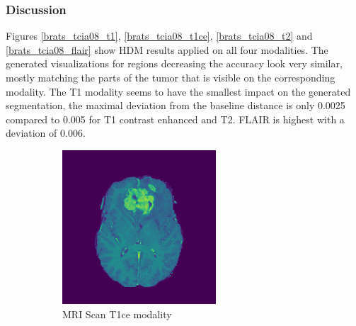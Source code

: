 \subsubsection{Discussion}
Figures \ref{brats_tcia08_t1}, \ref{brats_tcia08_t1ce}, \ref{brats_tcia08_t2} and \ref{brats_tcia08_flair} show HDM results applied on all four modalities. The generated visualizations for regions decreasing the accuracy look very similar, mostly matching the parts of the tumor that is visible on the corresponding modality. The T1 modality seems to have the smallest impact on the generated segmentation, the maximal deviation from the baseline distance is only 0.0025 compared to 0.005 for T1 contrast enhanced and T2. FLAIR is highest with a deviation of 0.006.



\begin{figure}[H]
    \centering
    \begin{subfigure}[t]{.45\textwidth}
        \centering
        \includegraphics[width=\linewidth]{chapters/06_hdm/book/0.png}
        \caption{MRI Scan T1ce modality}
    \end{subfigure}\hspace{1cm}%
    \begin{subfigure}[t]{.45\textwidth}
        \centering

\end{subfigure}
\end{figure}
